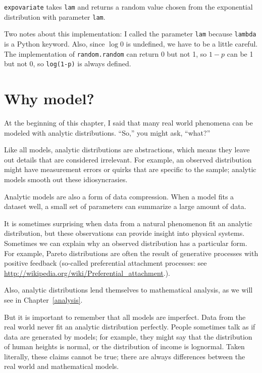 \documentclass[12pt]{book}
\theoremstyle{exercise}
\begin{document}
{\tt expovariate} takes {\tt lam} and returns a random value chosen
from the exponential distribution with parameter {\tt lam}.

Two notes about this implementation:
I called the parameter \verb"lam" because \verb"lambda" is a Python
keyword.  Also, since $\log 0$ is undefined, we have to
be a little careful.  The implementation of {\tt random.random}
can return 0 but not 1, so $1 - p$ can be 1 but not 0, so
{\tt log(1-p)} is always defined.%


\section{Why model?}%

At the beginning of this chapter, I said that many real world phenomena
can be modeled with analytic distributions.  ``So,'' you might ask,
``what?''%

Like all models, analytic distributions are abstractions, which
means they leave out details that are considered irrelevant.
For example, an observed distribution might have measurement errors
or quirks that are specific to the sample; analytic models smooth
out these idiosyncrasies.%

Analytic models are also a form of data compression.  When a model
fits a dataset well, a small set of parameters can summarize a
large amount of data.%
%

It is sometimes surprising when data from a natural phenomenon fit an
analytic distribution, but these observations can provide insight
into physical systems.  Sometimes we can explain why an observed
distribution has a particular form.  For example, Pareto distributions
are often the result of generative processes with positive feedback
(so-called preferential attachment processes: see
\url{http://wikipedia.org/wiki/Preferential_attachment}.).%
%
%
%
%

Also, analytic distributions lend themselves to mathematical
analysis, as we will see in Chapter~\ref{analysis}.

But it is important to remember that all models are imperfect.
Data from the real world never fit an analytic distribution perfectly.
People sometimes talk as if data are generated by models; for example,
they might say that the distribution of human heights is normal,
or the distribution of income is lognormal.  Taken literally, these
claims cannot be true; there are always differences between the
real world and mathematical models.
\end{document}
